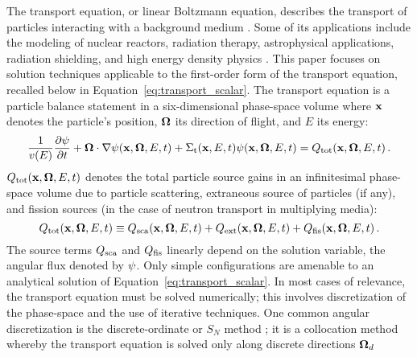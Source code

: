 
The transport equation, or linear Boltzmann equation, describes the
transport of particles interacting with a background medium \cite{add TE ref}.  Some
of its applications include the modeling of nuclear reactors, radiation
therapy, astrophysical applications, radiation shielding, and high energy density physics 
\cite{add several refs here for most of the applications}.
This paper focuses on solution techniques applicable to the first-order
form of the transport equation, recalled below in Equation~\eqref{eq:transport_scalar}. The 
transport equation is a particle balance statement in a six-dimensional phase-space volume
where $\mathbf{x}$ denotes the particle's position, $\mathbf{\Omega}$ its direction of flight, and $E$ its energy:
\begin{equation}\label{eq:transport_scalar}
  \frac{1}{v(E)}\frac{\partial \psi}{\partial t} + \mathbf{\Omega}\cdot\nabla\psi(\mathbf{x},\mathbf{\Omega},E,t)
    + \Sigma_\textup{t}(\mathbf{x},E,t)\psi(\mathbf{x},\mathbf{\Omega},E,t) = Q_\textup{tot}(\mathbf{x},\mathbf{\Omega},E,t)
  \,.
\end{equation}
$Q_\textup{tot}(\mathbf{x},\mathbf{\Omega},E,t)$ denotes the total particle source gains in an infinitesimal phase-space volume
due to particle scattering, extraneous source of particles (if any), and 
fission sources (in the case of neutron transport in multiplying media):
\begin{equation}
  Q_\textup{tot}(\mathbf{x},\mathbf{\Omega},E,t) \equiv Q_\textup{sca}(\mathbf{x},\mathbf{\Omega},E,t) + Q_\textup{ext}(\mathbf{x},\mathbf{\Omega},E,t) + Q_\textup{fis}(\mathbf{x},\mathbf{\Omega},E,t)
  \,.
\end{equation}
The source terms $Q_\textup{sca}$ and $Q_\textup{fis}$ linearly depend on the solution variable, the angular flux denoted by $\psi$. Only simple configurations are amenable to an analytical solution of Equation~\eqref{eq:transport_scalar}. 
In most cases of relevance, the transport equation must be solved numerically; this involves discretization 
of the phase-space and the use of iterative techniques.
One common angular discretization is the discrete-ordinate or $S_N$ method \cite{several sn refs}; it is a collocation method whereby the transport equation is solved only along discrete directions $\mathbf{\Omega}_d$ 

